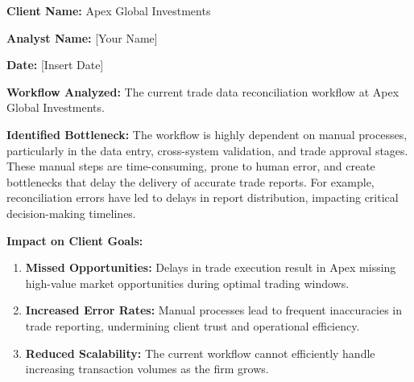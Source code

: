\documentclass[11pt]{article}
\begin{document}
\begin{tcolorbox}[enhanced, colback=boxgray, frame hidden, arc=2mm,
    left=5mm, right=5mm, top=4mm, bottom=4mm, breakable]
\textbf{Client Name:} Apex Global Investments\par
\textbf{Analyst Name:} [Your Name]\par
\textbf{Date:} [Insert Date]

\textbf{Workflow Analyzed:} The current trade data reconciliation workflow at
Apex Global Investments.\par\smallskip
\textbf{Identified Bottleneck:} The workflow is highly dependent on manual
processes, particularly in the data entry, cross-system validation, and trade
approval stages. These manual steps are time-consuming, prone to human error,
and create bottlenecks that delay the delivery of accurate trade reports. For
example, reconciliation errors have led to delays in report distribution,
impacting critical decision-making timelines.

\textbf{Impact on Client Goals:}
\begin{enumerate}[leftmargin=1.5em, itemsep=2pt]
  \item \textbf{Missed Opportunities:} Delays in trade execution result in
  Apex missing high-value market opportunities during optimal trading windows.
  \item \textbf{Increased Error Rates:} Manual processes lead to frequent
  inaccuracies in trade reporting, undermining client trust and operational
  efficiency.
  \item \textbf{Reduced Scalability:} The current workflow cannot efficiently
  handle increasing transaction volumes as the firm grows.
\end{enumerate}


\end{tcolorbox}
\end{document}
